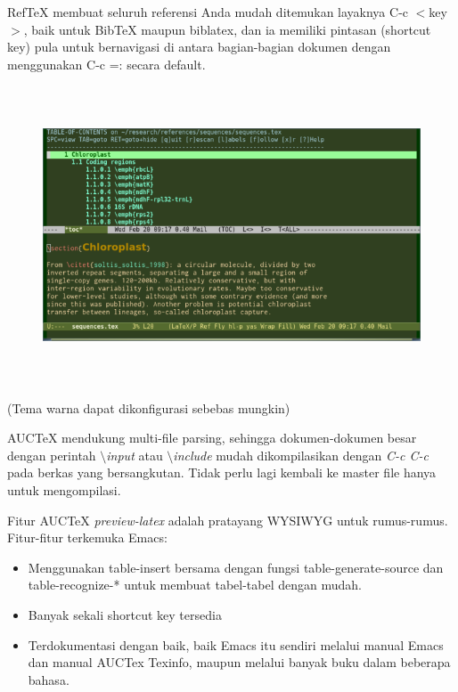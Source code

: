 \documentclass[12pt,a4paper]{article}
\begin{document}
\begin{enumerate}
RefTeX membuat seluruh referensi Anda mudah ditemukan layaknya C-c $<$key$>$, baik untuk BibTeX maupun biblatex, dan ia memiliki pintasan (shortcut key) pula untuk bernavigasi di antara bagian-bagian dokumen dengan menggunakan C-c =: secara default.

\begin{figure}[ht]
\centering
\includegraphics[width=15.64cm,height=8.83cm]{gambar/image3.jpg}
\end{figure}

(Tema warna dapat dikonfigurasi sebebas mungkin)

AUCTeX mendukung multi-file parsing, sehingga dokumen-dokumen besar dengan perintah \textit{$\setminus$input} atau \textit{
$\setminus$include} mudah dikompilasikan dengan \textit{C-c C-c} pada berkas yang bersangkutan. Tidak perlu lagi kembali ke master file hanya untuk mengompilasi.
\par \vspace{12pt}
Fitur AUCTeX \textit{preview-latex} adalah pratayang WYSIWYG untuk rumus-rumus. Fitur-fitur terkemuka Emacs:

\begin{itemize}
\item Menggunakan table-insert bersama dengan fungsi 
table-generate-source dan table-recognize-* untuk membuat tabel-tabel dengan mudah.
\item Banyak sekali shortcut key tersedia
\item Terdokumentasi dengan baik, baik Emacs itu sendiri melalui manual Emacs dan manual AUCTex Texinfo, maupun melalui banyak buku dalam beberapa bahasa.
\end{itemize}


\end{enumerate}
\end{document}
